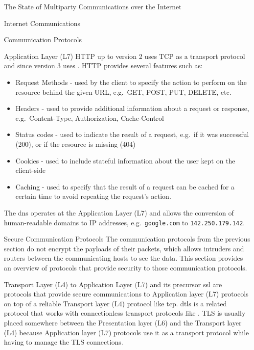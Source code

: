 \begin{frame}[fragile]{The State of Multiparty Communications over the Internet}
\begin{block}{Internet Communications}
\begin{block}{Communication Protocols}
\begin{block}{Application Layer (L7)}
HTTP up to version 2 uses TCP as a transport protocol and since version 3 uses . HTTP provides several features such as:

\begin{itemize}
\tightlist
\item
  Request Methods - used by the client to specify the action to perform on the resource behind the given URL, e.g.~GET, POST, PUT, DELETE, etc.
\item
  Headers - used to provide additional information about a request or response, e.g.~Content-Type, Authorization, Cache-Control
\item
  Status codes - used to indicate the result of a request, e.g.~if it was successful (200), or if the resource is missing (404)
\item
  Cookies - used to include stateful information about the user kept on the client-side
\item
  Caching - used to specify that the result of a request can be cached for a certain time to avoid repeating the request's action.
\end{itemize}

The \gls{dns} operates at the Application Layer (L7) and allows the conversion of human-readable domains to IP addresses, e.g.~\texttt{google.com} to \texttt{142.250.179.142}.
\end{block}
\end{block}

\begin{block}{Secure Communication Protocols}
\label{thesis__020-internet.md__secure-communication-protocols}
The communication protocols from the previous section do not encrypt the payloads of their packets, which allows intruders and routers between the communicating hosts to see the data. This section provides an overview of protocols that provide security to those communication protocols.

\begin{block}{Transport Layer (L4) to Application Layer (L7)}
\label{thesis__020-internet.md__transport-layer-l4-to-application-layer-l7}
 \autocite{tlsRFC} and its precursor \gls{ssl} are protocols that provide secure communications to Application layer (L7) protocols on top of a reliable Transport layer (L4) protocol like \gls{tcp}. \gls{dtls} is a related protocol that works with connectionless transport protocols like . TLS is usually placed somewhere between the Presentation layer (L6) and the Transport layer (L4) because Application layer (L7) protocols use it as a transport protocol while having to manage the TLS connections.


\end{block}
\end{block}
\end{block}
\end{frame}
